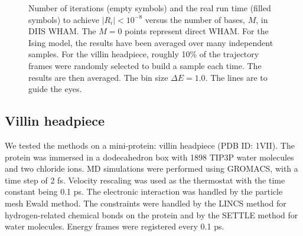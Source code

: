 \documentclass[reprint,superscriptaddress]{revtex4-1}
\begin{document}



\begin{figure}[h]
  \caption{
    \label{fig:nsnt}
    Number of iterations (empty symbols)
    and
    the real run time (filled symbols)
    to achieve $|R_i| < 10^{-8}$
    versus the number of bases, $M$,
    in DIIS WHAM.
    The $M = 0$ points represent direct WHAM.
    For the Ising model,
    the results have been averaged over many independent samples.
    For the villin headpiece,
    roughly 10\% of the trajectory frames
    were randomly selected
    to build a sample each time.
    The results are then averaged.
    The bin size $\Delta E = 1.0$.
    The lines are to guide the eyes.
  }
\end{figure}




\subsection{Villin headpiece}



We tested the methods on a mini-protein:
villin headpiece\cite{duan1998}
(PDB ID: 1VII).
%
The protein was immersed in
a dodecahedron box with 1898 TIP3P water molecules and two chloride ions.
%
MD simulations were performed
using GROMACS\cite{
berendsen1995, *lindahl2001, *vanderspoel2005, *hess2008},
with a time step of 2 fs.
%
Velocity rescaling\cite{bussi2007}
was used as the thermostat with
the time constant being 0.1 ps.
%
The electronic interaction was
handled by the particle mesh Ewald method\cite{
essmann1995}.
%
The constraints were handled by the LINCS method\cite{
hess1997}
for hydrogen-related chemical bonds on the protein
and by the SETTLE method\cite{
miyamoto1992}
for water molecules.
%
Energy frames were registered every 0.1 ps.
\end{document}
